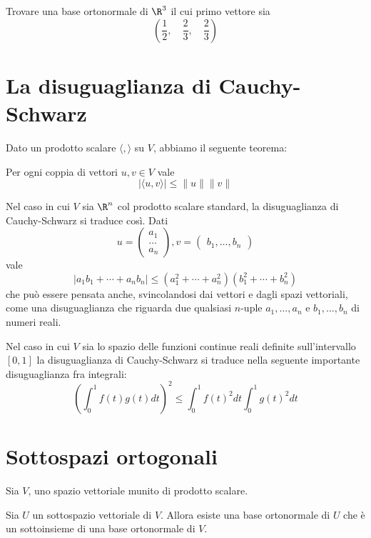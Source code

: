
\begin{example}
	Trovare una base ortonormale di $\R^3$ il cui primo vettore sia
	\[ \left( \frac{1}{2}, \quad \frac{2}{3}, \quad \frac{2}{3} \right) \]
\end{example}

\section{La disuguaglianza di Cauchy-Schwarz}
Dato un prodotto scalare $\langle , \rangle$ su $V$, abbiamo il seguente
teorema:

\begin{theorem}
	Per ogni coppia di vettori $u, v \in V$ vale
	\[
		|\langle u, v \rangle| \leq \| u \| \| v \|
	\]
\end{theorem}

\begin{example}
	Nel caso in cui $V$ sia $\R^n$ col prodotto scalare standard, la
	disuguaglianza di Cauchy-Schwarz si traduce così. Dati
	\[
		u = \begin{pmatrix}
			a_1 \\ \dots \\ a_n
		\end{pmatrix},
		v = \begin{pmatrix}
			b_1, \dots, b_n
		\end{pmatrix}
	\]
	vale
	\[
		|a_1 b_1 + \cdots + a_n b_n| \leq
		(a_1^2 + \cdots + a_n^2)(b_1^2 + \cdots + b_n^2)
	\]
	che può essere pensata anche, svincolandosi dai vettori e dagli spazi
	vettoriali, come una disuguaglianza che riguarda due qualsiasi $n$-uple
	$a_1, \dots, a_n$ e $b_1, \dots, b_n$ di numeri reali.
\end{example}

\begin{example}
	Nel caso in cui $V$ sia lo spazio delle funzioni continue reali definite
	sull'intervallo $[0, 1]$ la disuguaglianza di Cauchy-Schwarz si traduce
	nella seguente importante disuguaglianza fra integrali:
	\[
		\left( \int_0^1 f(t)g(t)dt \right)^2 \leq
		\int_0^1 f(t)^2 dt \int_0^1 g(t)^2 dt
	\]
\end{example}

\section{Sottospazi ortogonali}
Sia $V$, uno spazio vettoriale munito di prodotto scalare.

\begin{proposition}
	Sia $U$ un sottospazio vettoriale di $V$. Allora esiste una base
	ortonormale di $U$ che è un sottoinsieme di una base ortonormale di $V$.
\end{proposition}

